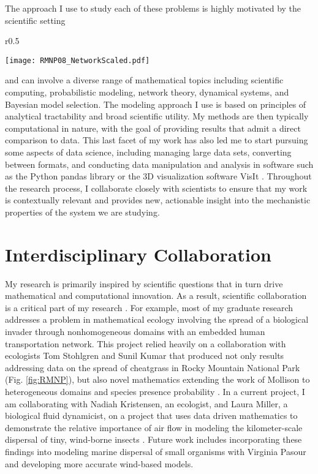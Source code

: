 \documentclass[11pt]{article}
\begin{document}
The approach I use to study each of these problems is highly motivated by the scientific setting
\begin{wrapfigure}{r}{0.5\textwidth}
\vspace{-23pt}
\begin{center}
\texttt{[image: RMNP08\_NetworkScaled.pdf]}
\caption{Presence probability of cheatgrass in Rocky Mountain National Park 9 years after initial presence data.}
\label{fig:RMNP}
\vspace{-20pt}
\end{center}
\end{wrapfigure}
and can involve a diverse range of mathematical topics including scientific computing, probabilistic modeling, network theory, dynamical systems, and Bayesian model selection. The modeling approach I use is based on principles of analytical tractability and broad scientific utility. My methods are then typically computational in nature, with the goal of providing results that admit a direct comparison to data. This last facet of my work has also led me to start pursuing some aspects of data science, including managing large data sets, converting between formats, and conducting data manipulation and analysis in software such as the Python pandas library or the 3D visualization software VisIt \cite{Strickland_parasitoids,Strickland_macrophyte}. Throughout the research process, I collaborate closely with scientists to ensure that my work is contextually relevant and provides new, actionable insight into the mechanistic properties of the system we are studying.

\section{Interdisciplinary Collaboration}

My research is primarily inspired by scientific questions that in turn drive mathematical and computational innovation. As a result, scientific collaboration is a critical part of my research \cite{Strickland_review}. For example, most of my graduate research addresses a problem in mathematical ecology involving the spread of a biological invader through nonhomogeneous domains with an embedded human transportation network. This project relied heavily on a collaboration with ecologists Tom Stohlgren and Sunil Kumar that produced not only results addressing data on the spread of cheatgrass in Rocky Mountain National Park \cite{Strickland15} (Fig. \ref{fig:RMNP}), but also novel mathematics extending the work of Mollison \cite{Mollison77} to heterogeneous domains and species presence probability \cite{Strickland14}. In a current project, I am collaborating with Nadiah Kristensen, an ecologist, and Laura Miller, a biological fluid dynamicist, on a project that uses data driven mathematics to demonstrate the relative importance of air flow in modeling the kilometer-scale dispersal of tiny, wind-borne insects \cite{Strickland_parasitoids}. Future work includes incorporating these findings into modeling marine dispersal of small organisms with Virginia Pasour \cite{Strickland_macrophyte} and developing more accurate wind-based models.
\end{document}
